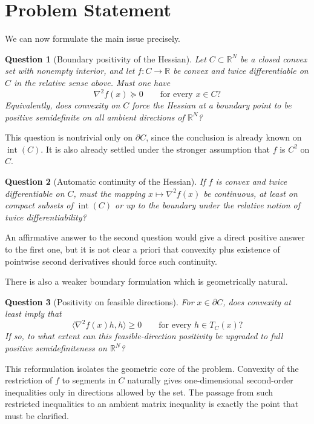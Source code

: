 \documentclass[11pt]{article}
\newtheorem{question}{Question}
\theoremstyle{remark}
\newcommand{\R}{\mathbb{R}}
\newcommand{\inner}[2]{\langle #1,#2\rangle}
\begin{document}
\section{Problem Statement}

We can now formulate the main issue precisely.

\begin{question}[Boundary positivity of the Hessian]
Let $C \subset \R^N$ be a closed convex set with nonempty interior, and let
$f \colon C \to \R$ be convex and twice differentiable on $C$ in the relative
sense above. Must one have
\[
\nabla^2 f(x) \succeq 0 \qquad \text{for every } x \in C?
\]
Equivalently, does convexity on $C$ force the Hessian at a boundary point to be
positive semidefinite on all ambient directions of $\R^N$?
\end{question}

This question is nontrivial only on $\partial C$, since the conclusion is already
known on $\operatorname{int}(C)$. It is also already settled under the stronger
assumption that $f$ is $C^2$ on $C$.

\begin{question}[Automatic continuity of the Hessian]
If $f$ is convex and twice differentiable on $C$, must the mapping
$x \mapsto \nabla^2 f(x)$ be continuous, at least on compact subsets of
$\operatorname{int}(C)$ or up to the boundary under the relative notion of
twice differentiability?
\end{question}

An affirmative answer to the second question would give a direct positive answer
to the first one, but it is not clear a priori that convexity plus existence of
pointwise second derivatives should force such continuity.

There is also a weaker boundary formulation which is geometrically natural.

\begin{question}[Positivity on feasible directions]
For $x \in \partial C$, does convexity at least imply that
\[
\inner{\nabla^2 f(x)h}{h} \geq 0 \qquad \text{for every } h \in T_C(x)?
\]
If so, to what extent can this feasible-direction positivity be upgraded to full
positive semidefiniteness on $\R^N$?
\end{question}

This reformulation isolates the geometric core of the problem. Convexity of the
restriction of $f$ to segments in $C$ naturally gives one-dimensional
second-order inequalities only in directions allowed by the set. The passage
from such restricted inequalities to an ambient matrix inequality is exactly the
point that must be clarified.
\end{document}
